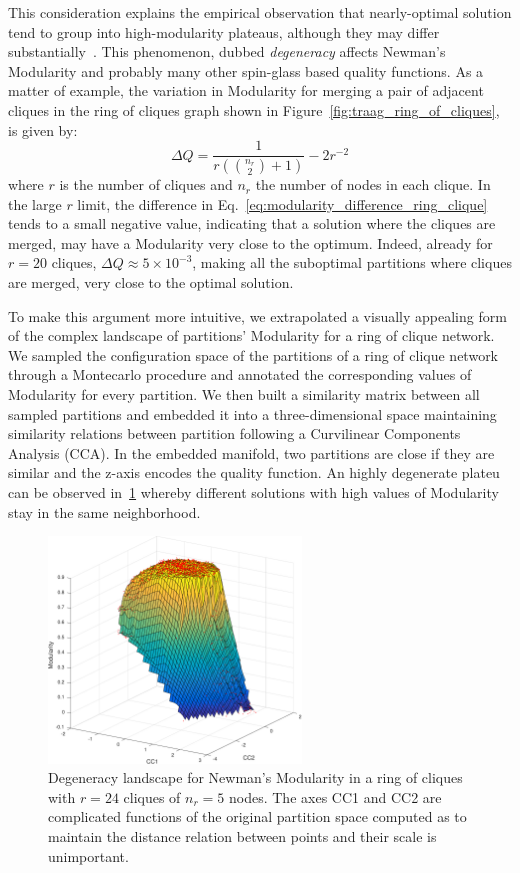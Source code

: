 This consideration explains the empirical observation that nearly-optimal solution tend to group into high-modularity plateaus, although they may differ substantially~\cite{good2009}. This phenomenon, dubbed \emph{degeneracy} affects Newman's Modularity and probably many other spin-glass based quality functions.
As a matter of example, the variation in Modularity for merging a pair of adjacent cliques in the ring of cliques graph shown in Figure~\ref{fig:traag_ring_of_cliques}, is given by:
\begin{equation}\label{eq:modularity_difference_ring_clique}
\Delta Q = \frac{1}{r\left(\binom{n_r}{2}+1\right)}-2r^{-2}
\end{equation}
where $r$ is the number of cliques and $n_r$ the number of nodes in each clique.
In the large $r$ limit, the difference in Eq.~\ref{eq:modularity_difference_ring_clique} tends to a small negative value, indicating that a solution where the cliques are merged, may have a Modularity very close to the optimum. Indeed, already for $r=20$ cliques, $\Delta Q \approx 5\times 10^{-3}$, making all the suboptimal partitions where cliques are merged, very close to the optimal solution.

To make this argument more intuitive, we extrapolated a visually appealing form of the complex landscape of partitions' Modularity for a ring of clique network. We sampled the configuration space of the partitions of a ring of clique network through a Montecarlo procedure and annotated the corresponding values of Modularity for every partition.
We then built a similarity matrix between all sampled partitions and embedded it into a three-dimensional space maintaining similarity relations between partition following a Curvilinear Components Analysis (CCA).
In the embedded manifold, two partitions are close if they are similar and the z-axis encodes the quality function.
An highly degenerate plateu can be observed in~\ref{fig:degeneracylandscape} whereby different solutions with high values of Modularity stay in the same neighborhood.

\begin{figure}[htb!]
\centering
\includegraphics[width=0.6\textwidth]{images/degeneracy_modularity.pdf}
\caption{Degeneracy landscape for Newman's Modularity in a ring of cliques with $r=24$ cliques of $n_r=5$ nodes. The axes CC1 and CC2 are complicated functions of the original partition space computed as to maintain the distance relation between points and their scale is unimportant.}
\label{fig:degeneracylandscape}
\end{figure}

